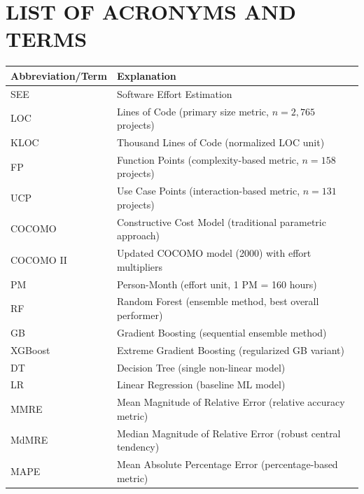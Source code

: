 \documentclass[11pt,a4paper]{article}
\begin{document}
\newpage

\tableofcontents

\newpage

\section*{LIST OF ACRONYMS AND TERMS}

\begin{table}[h]
\centering
\begin{tabular}{|l|l|}
\hline
\rowcolor{gray!30}
\textbf{Abbreviation/Term} & \textbf{Explanation} \\
\hline
SEE & Software Effort Estimation \\
\hline
LOC & Lines of Code (primary size metric, $n = 2,765$ projects) \\
\hline
KLOC & Thousand Lines of Code (normalized LOC unit) \\
\hline
FP & Function Points (complexity-based metric, $n = 158$ projects) \\
\hline
UCP & Use Case Points (interaction-based metric, $n = 131$ projects) \\
\hline
COCOMO & Constructive Cost Model (traditional parametric approach) \\
\hline
COCOMO II & Updated COCOMO model (2000) with effort multipliers \\
\hline
PM & Person-Month (effort unit, 1 PM = 160 hours) \\
\hline
RF & Random Forest (ensemble method, best overall performer) \\
\hline
GB & Gradient Boosting (sequential ensemble method) \\
\hline
XGBoost & Extreme Gradient Boosting (regularized GB variant) \\
\hline
DT & Decision Tree (single non-linear model) \\
\hline
LR & Linear Regression (baseline ML model) \\
\hline
MMRE & Mean Magnitude of Relative Error (relative accuracy metric) \\
\hline
MdMRE & Median Magnitude of Relative Error (robust central tendency) \\
\hline
MAPE & Mean Absolute Percentage Error (percentage-based metric) \\

\end{tabular}
\end{table}
\end{document}
